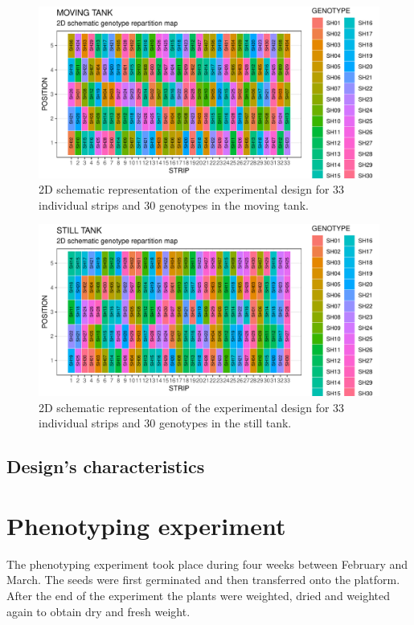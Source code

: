 \begin{figure}
    \includegraphics[width=\textwidth]{figures/moving_layout_30_genotypes.pdf} 
    \caption{2D schematic representation of the experimental design for 33 individual strips and 30 genotypes in the moving tank.}
    \label{fig:moving_layout_30_geno}
\end{figure}

\begin{figure}
    \includegraphics[width=\textwidth]{figures/still_layout_30_genotypes.pdf} 
    \caption{2D schematic representation of the experimental design for 33 individual strips and 30 genotypes in the still tank.}
    \label{fig:still_layout_30_geno}
\end{figure}

\subsection{Design's characteristics}


\section{Phenotyping experiment}
The phenotyping experiment took place during four weeks between February and March. The seeds were first germinated and then transferred onto the platform. After the end of the experiment the plants were weighted, dried and weighted again to obtain dry and fresh weight.

